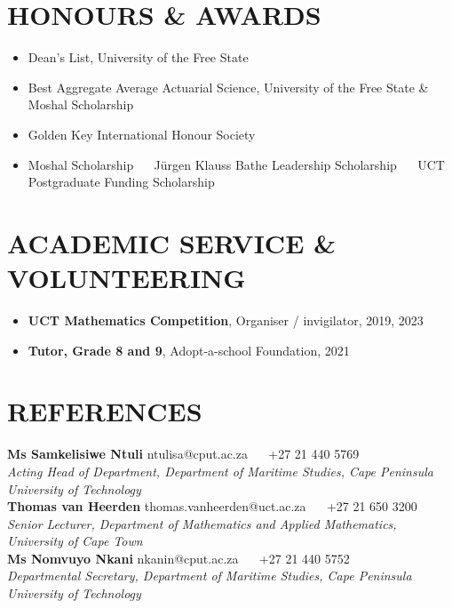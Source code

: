 \documentclass[letterpaper,11pt]{article}
\newcommand{\resumeItem}[1]{
  \item\small{
    {#1 \vspace{-1pt}}
  }
}
\newcommand{\resumeItemListStart}{\begin{itemize}[leftmargin=0.1in]}
\newcommand{\resumeItemListEnd}{\end{itemize}\vspace{-5pt}}
\begin{document}
\section{\color{airforceblue}HONOURS \& AWARDS}
  \resumeItemListStart
    \resumeItem{\normalsize{Dean's List, University of the Free State}}
    \vspace{-3pt}
    \resumeItem{\normalsize{Best Aggregate Average Actuarial Science, University of the Free State \& Moshal Scholarship}}
    \vspace{-3pt}
    \resumeItem{\normalsize{Golden Key International Honour Society}}
    \vspace{-3pt}
    \resumeItem{\normalsize{Moshal Scholarship ~\textbar~ J\"urgen Klauss Bathe Leadership Scholarship ~\textbar~ UCT Postgraduate Funding Scholarship}}
  \resumeItemListEnd
\vspace{4pt}

\section{\color{airforceblue}ACADEMIC SERVICE \& VOLUNTEERING}
      \resumeItemListStart
        \resumeItem{\normalsize{\textbf{UCT Mathematics Competition}, Organiser / invigilator, 2019, 2023}}
        \vspace{-3pt}
        \resumeItem{\normalsize{\textbf{Tutor, Grade 8 and 9}, Adopt-a-school Foundation, 2021}}
      \resumeItemListEnd
\vspace{4pt}

\section{\color{airforceblue}REFERENCES}
 \begin{itemize}[leftmargin=0in, label={}]
    \small{\item{
     \textbf{\normalsize{Ms Samkelisiwe Ntuli}} \hfill \normalsize{ntulisa@cput.ac.za ~\textbar~ +27 21 440 5769} \\
     \normalsize{\textit{Acting Head of Department, Department of Maritime Studies, Cape Peninsula University of Technology}} \\
      \vspace{6pt}
     \textbf{\normalsize{Thomas van Heerden}} \hfill \normalsize{thomas.vanheerden@uct.ac.za ~\textbar~ +27 21 650 3200} \\
     \normalsize{\textit{Senior Lecturer, Department of Mathematics and Applied Mathematics, University of Cape Town}} \\
      \vspace{6pt}
     \textbf{\normalsize{Ms Nomvuyo Nkani}} \hfill \normalsize{nkanin@cput.ac.za ~\textbar~ +27 21 440 5752} \\
     \normalsize{\textit{Departmental Secretary, Department of Maritime Studies, Cape Peninsula University of Technology}}
     }}
 \end{itemize}
\end{document}
